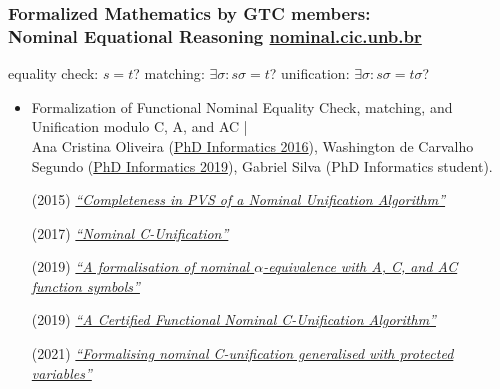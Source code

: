 \documentclass[10pt]{beamer}
\begin{document}
\begin{frame}[fragile]
  \frametitle{Formalized Mathematics by GTC members:\\
    Nominal Equational Reasoning \hfill \href{http://nominal.cic.unb.br}{\color{blue} nominal.cic.unb.br}}

{\color{blue} equality check}:    $s = t$? \hspace{.4cm}   {\color{blue} matching}: $\exists \sigma
  : s\sigma = t$? \hspace{.4cm}  {\color{blue} unification}: $\exists \sigma
  : s\sigma = t\sigma$?

{\footnotesize
\begin{itemize}

\item Formalization of Functional Nominal  Equality Check, matching, and Unification
  modulo C, A, and AC |  \\  Ana Cristina Oliveira (\href{https://repositorio.unb.br/handle/10482/22387}{\color{blue}PhD
Informatics  2016}), Washington de Carvalho Segundo
(\href{https://repositorio.unb.br/handle/10482/35474}{\color{blue}PhD Informatics
  2019}), Gabriel Silva (PhD Informatics student).

  (2015)  \href{https://doi.org/10.1016/j.entcs.2016.06.005}{\color{blue}\scriptsize\it ``Completeness in PVS of a Nominal Unification Algorithm''}



 (2017)  \href{https://doi.org/10.1007/978-3-319-94460-9_14}{\color{blue}\scriptsize\it ``Nominal
  C-Unification''} 

 (2019) \href{https://doi.org/10.1016/j.tcs.2019.02.020}{\color{blue}\scriptsize\it ``A formalisation of nominal $\alpha$-equivalence with A, C, and AC function symbols''}

 (2019) \href{https://doi.org/10.1007/978-3-030-45260-5_8}{\color{blue}\scriptsize\it ``A Certified Functional Nominal C-Unification Algorithm''}

  (2021) \href{https://doi.org/10.1017/S0960129521000050}{\color{blue}\scriptsize\it ``Formalising nominal C-unification generalised with protected variables''}



\end{itemize}
}

\end{frame}
\end{document}
